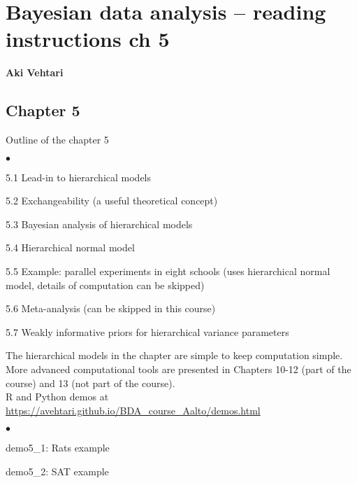 \documentclass[a4paper,11pt,english]{article}
\begin{document}
\thispagestyle{empty}

\section*{Bayesian data analysis -- reading instructions ch 5} 
\smallskip
{\bf Aki Vehtari}
\smallskip

\subsection*{Chapter 5}

Outline of the chapter 5
\begin{list}{$\bullet$}{\parsep=0pt\itemsep=2pt}
\item 5.1 Lead-in to hierarchical models
\item 5.2 Exchangeability (a useful theoretical concept)
\item 5.3 Bayesian analysis of hierarchical models
\item 5.4 Hierarchical normal model
\item 5.5 Example: parallel experiments in eight schools (uses hierarchical normal model, details of computation can be skipped)
\item 5.6 Meta-analysis (can be skipped in this course)
\item 5.7 Weakly informative priors for hierarchical variance parameters
\end{list}

The hierarchical models in the chapter are simple to keep computation
simple. More advanced computational tools are presented in Chapters
10-12 (part of the course) and 13 (not part of the course).\\

R and Python demos at \url{https://avehtari.github.io/BDA_course_Aalto/demos.html}
\begin{list}{$\bullet$}{\parsep=0pt\itemsep=2pt}
\item demo5\_1: Rats example
\item demo5\_2: SAT example
\end{list}
\end{document}

